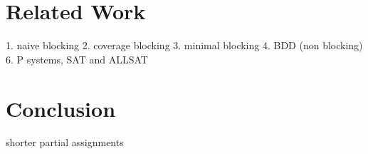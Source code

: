 \section{Related Work} \label{sec:rela}
1. naive blocking
2. coverage blocking
3. minimal blocking
4. BDD (non blocking)
6. P systems, SAT and ALLSAT

\section{Conclusion} \label{sec:conc}
shorter partial assignments